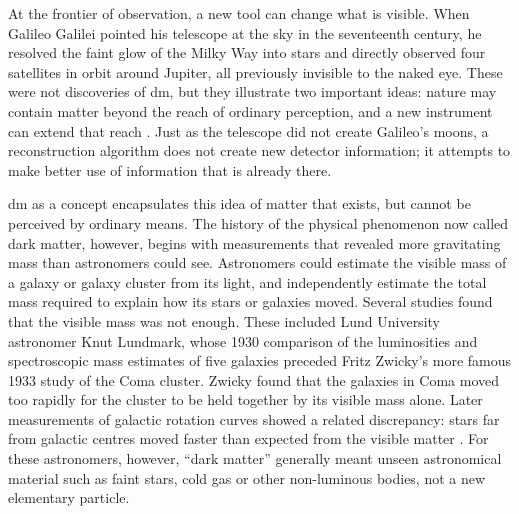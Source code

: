 At the frontier of observation, a new tool can change what is visible. When
Galileo Galilei pointed his telescope at the sky in the seventeenth century, he
resolved the faint glow of the Milky Way into stars and directly observed four
satellites in orbit around Jupiter, all previously invisible to the naked eye.
These were not discoveries of \gls{dm}, but they illustrate two important ideas:
nature may contain matter beyond the reach of ordinary perception, and a new
instrument can extend that reach \cite{bertone2016-history-dark-matter}. Just as
the telescope did not create Galileo's moons, a reconstruction algorithm does
not create new detector information; it attempts to make better use of
information that is already there.

\gls{dm} as a concept encapsulates this idea of matter that exists, but cannot
be perceived by ordinary means. The history of the physical phenomenon now
called dark matter, however, begins with measurements that revealed more
gravitating mass than astronomers could see. Astronomers could estimate the
visible mass of a galaxy or galaxy cluster from its light, and independently
estimate the total mass required to explain how its stars or galaxies moved.
Several studies found that the visible mass was not enough. These included Lund
University astronomer Knut Lundmark, whose 1930 comparison of the luminosities
and spectroscopic mass estimates of five galaxies preceded Fritz Zwicky's more
famous 1933 study of the Coma cluster. Zwicky found that the galaxies in Coma
moved too rapidly for the cluster to be held together by its visible mass alone.
Later measurements of galactic rotation curves showed a related discrepancy:
stars far from galactic centres moved faster than expected from the visible
matter \cite{lundmark1930-galaxy-masses,bertone2016-history-dark-matter,
orodruin2016-lundmark-darkmatter}. For these astronomers, however, ``dark
matter'' generally meant unseen astronomical material such as faint stars, cold
gas or other non-luminous bodies, not a new elementary particle.


